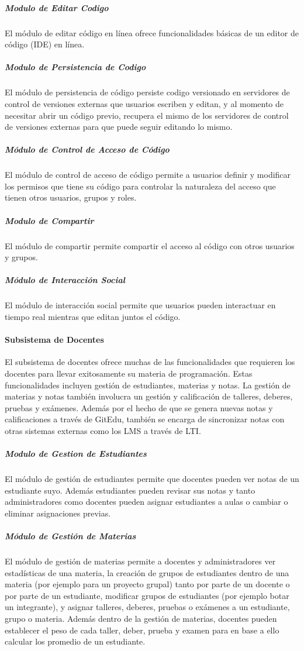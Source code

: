 \subparagraph{Modulo de Editar Codigo}
El módulo de editar código en línea ofrece funcionalidades básicas de un editor de código (IDE) en línea.

\subparagraph{Modulo de Persistencia de Codigo}
El módulo de persistencia de código persiste codigo versionado en servidores de control de versiones externas que usuarios escriben y editan, y al momento de necesitar abrir un código previo, recupera el mismo de los servidores de control de versiones externas para que puede seguir editando lo mismo.

\subparagraph{Módulo de Control de Acceso de Código}
El módulo de control de acceso de código permite a usuarios definir y modificar los permisos que tiene su código para controlar la naturaleza del acceso que tienen otros usuarios, grupos y roles.

\subparagraph{Modulo de Compartir}
El módulo de compartir permite compartir el acceso al código con otros usuarios y grupos.

\subparagraph{Módulo de Interacción Social}
El módulo de interacción social permite que usuarios pueden interactuar en tiempo real mientras que editan juntos el código.

\paragraph{Subsistema de Docentes}
El subsistema de docentes ofrece muchas de las funcionalidades que requieren los docentes para llevar exitosamente su materia de programación. Estas funcionalidades incluyen gestión de estudiantes, materias y notas. La gestión de materias y notas también involucra un gestión y calificación de talleres, deberes, pruebas y exámenes. Además por el hecho de que se genera nuevas notas y calificaciones a través de GitEdu, también se encarga de sincronizar notas con otras sistemas externas como los LMS  a través de LTI.

\subparagraph{Modulo de Gestion de Estudiantes}
El módulo de gestión de estudiantes permite que docentes pueden ver notas de un estudiante suyo. Además estudiantes pueden revisar sus notas y tanto administradores como docentes pueden asignar estudiantes a aulas o cambiar o eliminar asignaciones previas.

\subparagraph{Módulo de Gestión de Materias}
El módulo de gestión de materias permite a docentes y administradores ver estadísticas de una materia, la creación de grupos de estudiantes dentro de una materia (por ejemplo para un proyecto grupal) tanto por parte de un docente o por parte de un estudiante, modificar grupos de estudiantes (por ejemplo botar un integrante), y asignar talleres, deberes, pruebas o exámenes a un estudiante, grupo o materia. Además dentro de la gestión de materias, docentes pueden establecer el peso de cada taller, deber, prueba y examen para en base a ello calcular los promedio de un estudiante.

